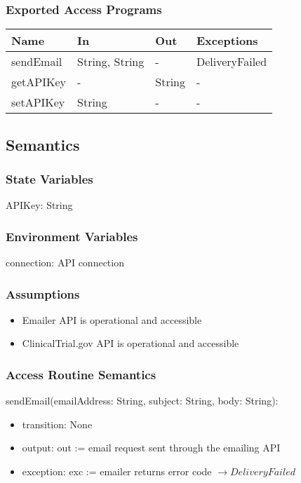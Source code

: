 \documentclass[12pt, titlepage]{article}
\begin{document}
\subsubsection{Exported Access Programs}

\begin{center}
\begin{tabular}{p{4cm} p{4cm} p{4cm} p{4cm}}
\hline
\textbf{Name} & \textbf{In} & \textbf{Out} & \textbf{Exceptions} \\
\hline
sendEmail & String, String & - & DeliveryFailed \\
\hline
getAPIKey & - & String & - \\
\hline
setAPIKey & String & - & - \\
\hline
\end{tabular}
\end{center}

\subsection{Semantics}

\subsubsection{State Variables}
APIKey: String

\subsubsection{Environment Variables}
connection: API connection

\subsubsection{Assumptions}
\begin{itemize}
  \item Emailer API is operational and accessible
  \item ClinicalTrial.gov API is operational and accessible
\end{itemize}

\subsubsection{Access Routine Semantics}

\noindent sendEmail(emailAddress: String, subject: String, body: String):
\begin{itemize}
\item transition: None
\item output: out := email request sent through the emailing API
\item exception: exc := emailer returns error code $\rightarrow DeliveryFailed$
\end{itemize}
\end{document}
